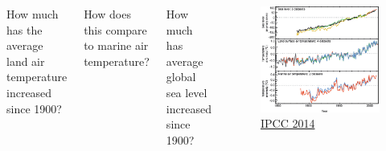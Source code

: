 \begin{frame}
    \begin{adjustwidth}{-2em}{-1.5em}
    \begin{columns}

        {\small
        How much has the average land air temperature increased since 1900?

        
        \vspace{2mm}
        How does this compare to marine air temperature?


        \vspace{2mm}
        How much has average global sea level increased since 1900?
        
        }

        \vspace{-0.1cm}
        \begin{figure}
        \begin{center} 
            \includegraphics[width=\columnwidth]{../images/ipcc-ar5-wg1-temp-sea-level-collage.png}
            \caption{\href{http://www.ipcc.ch/report/ar5/syr/}{IPCC 2014}}
        \end{center}
        \end{figure}
    \end{columns}
    \end{adjustwidth}
\end{frame}

